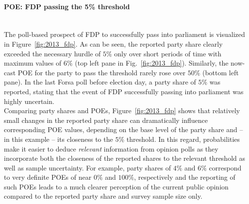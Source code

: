 \documentclass[smallextended]{svjour3}      %
\begin{document}
\paragraph{POE: FDP passing the 5\% threshold} \ \\

The poll-based prospect of FDP to successfully pass into parliament is visualized
in Figure~\ref{fig:2013_fdp}.
As can be seen, the reported party share clearly exceeded the necessary hurdle
of $5\%$ only over short periods of time with maximum values
of $6\%$ (top left pane in Fig.~\ref{fig:2013_fdp}). Similarly, the now-cast POE
for the party to pass the threshold rarely rose over $50\%$ (bottom left pane).
In the last Forsa poll before election day, a party share of $5\%$ was reported,
stating that the event of FDP successfully passing into parliament was highly uncertain.\\

Comparing party shares and POEs, Figure~\ref{fig:2013_fdp} shows
that relatively small changes in the reported party share can dramatically influence
corresponding POE values, depending on the base level of the party share and
-- in this example -- its closeness to the $5\%$ threshold.
In this regard, probabilities make it easier to deduce {\it relevant} information
from opinion polls as they incorporate both the closeness of the reported shares
to the relevant threshold as well as sample uncertainty.
For example, party shares of $4\%$ and $6\%$
correspond to very definite POEs of near $0\%$ and $100\%$,
respectively and the reporting of such POEs leads to a much clearer perception
of the current public opinion compared to the reported party share and
survey sample size only. \\
\end{document}
